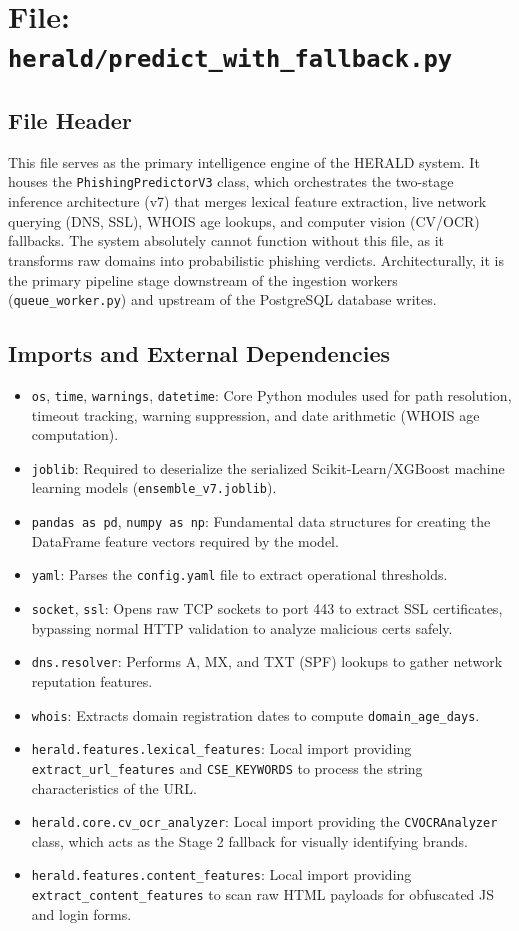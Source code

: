 \documentclass[12pt,a4paper]{report}
\begin{document}
\section{File: \texttt{herald/predict\_with\_fallback.py}}
\subsection*{File Header}
This file serves as the primary intelligence engine of the HERALD system. It houses the \texttt{PhishingPredictorV3} class, which orchestrates the two-stage inference architecture (v7) that merges lexical feature extraction, live network querying (DNS, SSL), WHOIS age lookups, and computer vision (CV/OCR) fallbacks. The system absolutely cannot function without this file, as it transforms raw domains into probabilistic phishing verdicts. Architecturally, it is the primary pipeline stage downstream of the ingestion workers (\texttt{queue\_worker.py}) and upstream of the PostgreSQL database writes.

\subsection{Imports and External Dependencies}
\begin{itemize}
\item \texttt{os}, \texttt{time}, \texttt{warnings}, \texttt{datetime}: Core Python modules used for path resolution, timeout tracking, warning suppression, and date arithmetic (WHOIS age computation).
\item \texttt{joblib}: Required to deserialize the serialized Scikit-Learn/XGBoost machine learning models (\texttt{ensemble\_v7.joblib}).
\item \texttt{pandas as pd}, \texttt{numpy as np}: Fundamental data structures for creating the DataFrame feature vectors required by the model.
\item \texttt{yaml}: Parses the \texttt{config.yaml} file to extract operational thresholds.
\item \texttt{socket}, \texttt{ssl}: Opens raw TCP sockets to port 443 to extract SSL certificates, bypassing normal HTTP validation to analyze malicious certs safely.
\item \texttt{dns.resolver}: Performs A, MX, and TXT (SPF) lookups to gather network reputation features.
\item \texttt{whois}: Extracts domain registration dates to compute \texttt{domain\_age\_days}.
\item \texttt{herald.features.lexical\_features}: Local import providing \texttt{extract\_url\_features} and \texttt{CSE\_KEYWORDS} to process the string characteristics of the URL.
\item \texttt{herald.core.cv\_ocr\_analyzer}: Local import providing the \texttt{CVOCRAnalyzer} class, which acts as the Stage 2 fallback for visually identifying brands.
\item \texttt{herald.features.content\_features}: Local import providing \texttt{extract\_content\_features} to scan raw HTML payloads for obfuscated JS and login forms.
\end{itemize}
\end{document}
